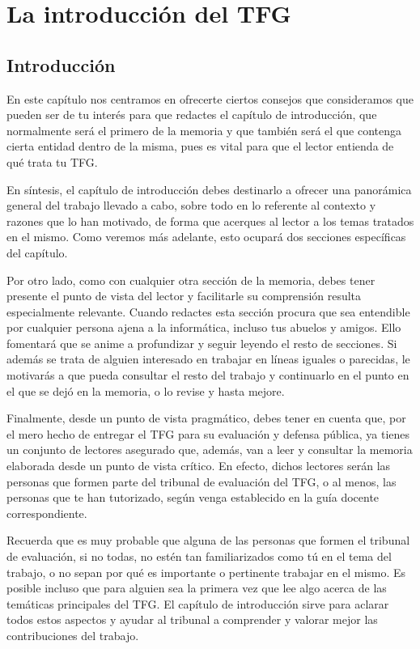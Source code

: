 \chapter{La introducción del TFG}
\label{cap:IntroducciónTFG}

\section{Introducción}

En este capítulo nos centramos en ofrecerte ciertos consejos que consideramos que pueden ser de tu interés para que redactes el capítulo de introducción, que normalmente será el primero de la memoria y que también será el que contenga cierta entidad dentro de la misma, pues es vital para que el lector entienda de qué trata tu TFG.

En síntesis, el capítulo de introducción debes destinarlo a ofrecer una panorámica general del trabajo llevado a cabo, sobre todo en lo referente al contexto y razones que lo han motivado, de forma que acerques al lector a los temas tratados en el mismo. Como veremos más adelante, esto ocupará dos secciones específicas del capítulo.

Por otro lado, como con cualquier otra sección de la memoria, debes tener presente el punto de vista del lector y facilitarle su comprensión resulta especialmente relevante. Cuando redactes esta sección procura que sea entendible por cualquier persona ajena a la informática, incluso tus abuelos y amigos. Ello fomentará que se anime a profundizar y seguir leyendo el resto de secciones. Si además se trata de alguien interesado en trabajar en líneas iguales o parecidas, le motivarás a que pueda consultar el resto del trabajo y continuarlo en el punto en el que se dejó en la memoria, o lo revise y hasta mejore.

Finalmente, desde un punto de vista pragmático, debes tener en cuenta que, por el mero hecho de entregar el TFG para su evaluación y defensa pública, ya tienes un conjunto de lectores asegurado que, además, van a leer y consultar la memoria elaborada desde un punto de vista crítico. En efecto, dichos lectores serán las personas que formen parte del tribunal de evaluación del TFG, o al menos, las personas que te han tutorizado, según venga establecido en la guía docente correspondiente.

Recuerda que es muy probable que alguna de las personas que formen el tribunal de evaluación, si no todas, no estén tan familiarizados como tú en el tema del trabajo, o no sepan por qué es importante o pertinente trabajar en el mismo. Es posible incluso que para alguien sea la primera vez que lee algo acerca de las temáticas principales del TFG. El capítulo de introducción sirve para aclarar todos estos aspectos y ayudar al tribunal a comprender y valorar mejor las contribuciones del trabajo.

